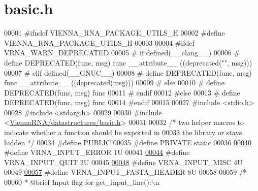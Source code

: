 \hypertarget{utils_2basic_8h_source}{}\section{basic.\+h}
\label{utils_2basic_8h_source}

\begin{DoxyCode}
00001 \textcolor{preprocessor}{#ifndef VIENNA\_RNA\_PACKAGE\_UTILS\_H}
00002 \textcolor{preprocessor}{#define VIENNA\_RNA\_PACKAGE\_UTILS\_H}
00003 
00004 \textcolor{preprocessor}{#ifdef VRNA\_WARN\_DEPRECATED}
00005 \textcolor{preprocessor}{# if defined(\_\_clang\_\_)}
00006 \textcolor{preprocessor}{#  define DEPRECATED(func, msg) func \_\_attribute\_\_ ((deprecated("", msg)))}
00007 \textcolor{preprocessor}{# elif defined(\_\_GNUC\_\_)}
00008 \textcolor{preprocessor}{#  define DEPRECATED(func, msg) func \_\_attribute\_\_ ((deprecated(msg)))}
00009 \textcolor{preprocessor}{# else}
00010 \textcolor{preprocessor}{#  define DEPRECATED(func, msg) func}
00011 \textcolor{preprocessor}{# endif}
00012 \textcolor{preprocessor}{#else}
00013 \textcolor{preprocessor}{# define DEPRECATED(func, msg) func}
00014 \textcolor{preprocessor}{#endif}
00015 
00027 \textcolor{preprocessor}{#include <stdio.h>}
00028 \textcolor{preprocessor}{#include <stdarg.h>}
00029 
00030 \textcolor{preprocessor}{#include <\hyperlink{datastructures_2basic_8h}{ViennaRNA/datastructures/basic.h}>}
00031 
00032 \textcolor{comment}{/* two helper macros to indicate whether a function should be exported in}
00033 \textcolor{comment}{the library or stays hidden */}
00034 \textcolor{preprocessor}{#define PUBLIC}
00035 \textcolor{preprocessor}{#define PRIVATE static}
00036 
\hyperlink{group__utils_gad403c9ea58f1836689404c2931419c8c}{00040} \textcolor{preprocessor}{#define VRNA\_INPUT\_ERROR                  1U}
00041 
\hyperlink{group__utils_ga72f3c6ca5c83d2b9baed2922d19c403d}{00044} \textcolor{preprocessor}{#define VRNA\_INPUT\_QUIT                   2U}
00045 
\hyperlink{group__utils_ga8e3241b321c9c1a78a69e59e2e019a71}{00048} \textcolor{preprocessor}{#define VRNA\_INPUT\_MISC                   4U}
00049 
\hyperlink{group__utils_ga2f0d8069e93d3ac54d9320d6bdb8e7e7}{00057} \textcolor{preprocessor}{#define VRNA\_INPUT\_FASTA\_HEADER           8U}
00058 
00059 \textcolor{comment}{/*}
00060 \textcolor{comment}{ *  @brief  Input flag for get\_input\_line():\(\backslash\)n}

\end{DoxyCode}
